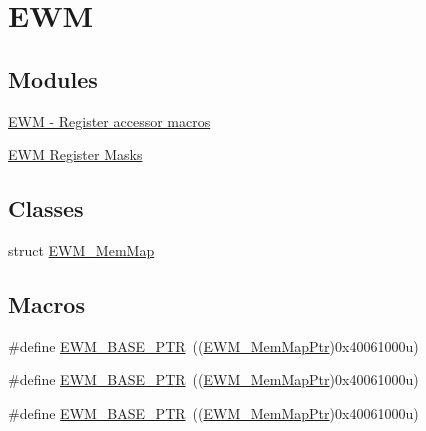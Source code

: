 \hypertarget{group___e_w_m___peripheral}{}\section{E\+WM}
\label{group___e_w_m___peripheral}
\subsection*{Modules}
\begin{DoxyCompactItemize}
\item 
\hyperlink{group___e_w_m___register___accessor___macros}{E\+W\+M -\/ Register accessor macros}
\item 
\hyperlink{group___e_w_m___register___masks}{E\+W\+M Register Masks}
\end{DoxyCompactItemize}
\subsection*{Classes}
\begin{DoxyCompactItemize}
\item 
struct \hyperlink{struct_e_w_m___mem_map}{E\+W\+M\+\_\+\+Mem\+Map}
\end{DoxyCompactItemize}
\subsection*{Macros}
\begin{DoxyCompactItemize}
\item 
\#define \hyperlink{group___e_w_m___peripheral_gae3454b5b37183b746362498d1fafc40c}{E\+W\+M\+\_\+\+B\+A\+S\+E\+\_\+\+P\+TR}~((\hyperlink{group___e_w_m___peripheral_ga1de35bc04fc7fa4929507210147339a6}{E\+W\+M\+\_\+\+Mem\+Map\+Ptr})0x40061000u)
\item 
\#define \hyperlink{group___e_w_m___peripheral_gae3454b5b37183b746362498d1fafc40c}{E\+W\+M\+\_\+\+B\+A\+S\+E\+\_\+\+P\+TR}~((\hyperlink{group___e_w_m___peripheral_ga1de35bc04fc7fa4929507210147339a6}{E\+W\+M\+\_\+\+Mem\+Map\+Ptr})0x40061000u)
\item 
\#define \hyperlink{group___e_w_m___peripheral_gae3454b5b37183b746362498d1fafc40c}{E\+W\+M\+\_\+\+B\+A\+S\+E\+\_\+\+P\+TR}~((\hyperlink{group___e_w_m___peripheral_ga1de35bc04fc7fa4929507210147339a6}{E\+W\+M\+\_\+\+Mem\+Map\+Ptr})0x40061000u)
\end{DoxyCompactItemize}
